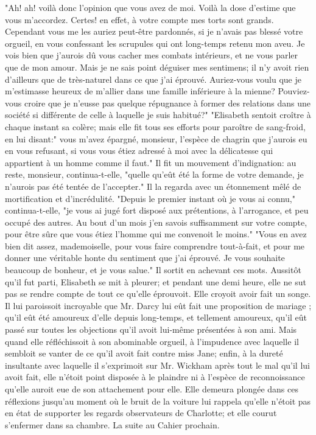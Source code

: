 "Ah! ah! voilà donc l'opinion que vous avez de moi. Voilà la dose d'estime que vous m'accordez. Certes! en effet, à votre compte mes torts sont grands. Cependant vous me les auriez peut-être pardonnés, si je n'avais pas blessé votre orgueil, en vous confessant les scrupules qui ont long-temps retenu mon aveu. Je vois bien que j'aurois dû vous cacher mes combats intérieurs, et ne vous parler que de mon amour. Mais je ne sais point déguiser mes sentimens; il n'y avoit rien d'ailleurs que de très-naturel dans ce que j'ai éprouvé. Auriez-vous voulu que je m'estimasse heureux de m'allier dans une famille inférieure à la mienne? Pouviez-vous croire que je n'eusse pas quelque répugnance à former des relations dans une société si différente de celle à laquelle je suis habitué?"
"Elisabeth sentoit croître à chaque instant sa colère; mais elle fit tous ses efforts pour paroître de sang-froid, en lui disant:" vous m'avez épargné, monsieur, l'espèce de chagrin que j'aurois eu en vous refusant, si vous vous étiez adressé à moi avec la délicatesse qui appartient à un homme comme il faut."
Il fit un mouvement d'indignation: au reste, monsieur, continua-t-elle, "quelle\setcounter{page}{553} qu'eût été la forme de votre demande, je n'aurois pas été tentée de l'accepter."
Il la regarda avec un étonnement mêlé de mortification et d'incrédulité.
"Depuis le premier instant où je vous ai connu," continua-t-elle, "je vous ai jugé fort disposé aux prétentions, à l'arrogance, et peu occupé des autres. Au bout d'un mois j'en savois suffisamment sur votre compte, pour être sûre que vous étiez l'homme qui me convenoit le moins."
"Vous en avez bien dit assez, mademoiselle, pour vous faire comprendre tout-à-fait, et pour me donner une véritable honte du sentiment que j'ai éprouvé. Je vous souhaite beaucoup de bonheur, et je vous salue." Il sortit en achevant ces mots.
Aussitôt qu'il fut parti, Elisabeth se mit à pleurer; et pendant une demi heure, elle ne sut pas se rendre compte de tout ce qu'elle éprouvoit. Elle croyoit avoir fait un songe. Il lui paroissoit incroyable que Mr. Darcy lui eût fait une proposition de mariage ; qu'il eût été amoureux d'elle depuis long-temps, et tellement amoureux, qu'il eût passé sur toutes les objections qu'il avoit lui-même présentées à son ami. Mais quand elle réfléchissoit à son abominable orgueil, à l'impudence avec laquelle il sembloit se\setcounter{page}{554} vanter de ce qu'il avoit fait contre miss Jane; enfin, à la dureté insultante avec laquelle il s'exprimoit sur Mr. Wickham après tout le mal qu'il lui avoit fait, elle n'étoit point disposée à le plaindre ni à l'espèce de reconnoissance qu'elle auroit eue de son attachement pour elle. Elle demeura plongée dans ces réflexions jusqu'au moment où le bruit de la voiture lui rappela qu'elle n'étoit pas en état de supporter les regards observateurs de Charlotte; et elle courut s'enfermer dans sa chambre.
La suite au Cahier prochain.